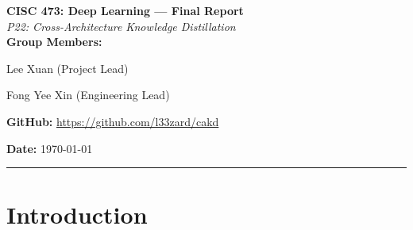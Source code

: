 \documentclass[11pt, letterpaper]{article}
\begin{document}
{\centering
  {\Large\textbf{CISC 473: Deep Learning --- Final Report}}\\[0.5em]
  {\large\textit{P22: Cross-Architecture Knowledge Distillation}}\\[0.4em]
  \textbf{Group Members:}\par
  Lee Xuan  \quad (Project Lead)\par
  Fong Yee Xin  \quad (Engineering Lead)\par
  \textbf{GitHub:} \url{https://github.com/l33zard/cakd}\par
  \textbf{Date:} \today\par\vspace{0.4em}
  \rule{\linewidth}{0.4pt}
}

\begin{abstract}
Knowledge distillation (KD) compresses a large teacher network into a
compact student, but feature-level KD methods assume teacher and student
share an architectural family. We study cross-architecture KD from a
ResNet-50 teacher to a DeiT-Tiny vision-transformer student on CIFAR-100,
where spatial feature maps must be related to patch-token sequences. All
models are trained from scratch for 100 epochs on $32\times32$ inputs, and the
teacher reaches 75.35\% test top-1. We reproduce logit-based KD, which improves test top-1 from 55.05\% to 61.55\%
($+6.50$\,pp), then add CKA-based projected-feature alignment, which
improves top-1 only marginally to 61.91\% ($+0.36$\,pp). Crucially, we
measure teacher--student CKA similarity before and after alignment: raw CKA
is \emph{unchanged} ($0.269 \to 0.260$, within batch noise), while projected
CKA rises substantially ($0.348 \to 0.839$) because the projection is
trained jointly with the student. Our primary contribution is a diagnostic
result: \textbf{CKA similarity is a weak predictor of accuracy gain} from
feature alignment, and \textbf{projected CKA is a confounded metric} that
inflates apparent transfer without evidence of improved representation
similarity. A failure analysis further shows that the remaining
teacher--student gap is dominated by fine-grained confusions within
CIFAR-100 superclasses. We argue that future alignment work should report raw CKA, and
we provide an open pipeline for the four-model comparison
(supervised, KD, KD$+$alignment, and teacher) that supports this conclusion.
\end{abstract}

\section{Introduction}
\end{document}
